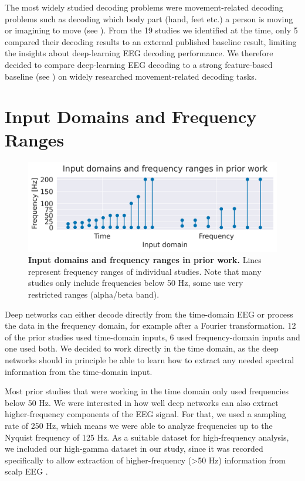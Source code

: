     The most widely studied decoding problems were movement-related decoding
problems such as decoding which body part (hand, feet etc.) a person is
moving or imagining to move (see
). From the 19 studies we
identified at the time, only 5 compared their decoding results to an
external published baseline result, limiting the insights about
deep-learning EEG decoding performance. We therefore decided to compare
deep-learning EEG decoding to a strong feature-based baseline (see
) on widely researched
movement-related decoding tasks.

\section{Input Domains and Frequency
Ranges}\label{input-domains-and-frequency-ranges}


\begin{figure}[ht]
    \myfloatalign
    \includegraphics[width=0.9\linewidth,trim={0 0 0 1cm},clip]{images/input-domain-freq-ranges.png}
    \caption[Input domains and frequency ranges in prior work.]{\textbf{Input domains and frequency ranges in prior work.} Lines represent frequency ranges of individual studies. Note that many studies
only include frequencies below 50 Hz, some use very restricted ranges
(alpha/beta band).}\label{input_domain_fig}
\end{figure}
    

    Deep networks can either decode directly from the time-domain EEG or
process the data in the frequency domain, for example after a Fourier
transformation. 12 of the prior studies used time-domain inputs, 6 used
frequency-domain inputs and one used both. We decided to work directly
in the time domain, as the deep networks should in principle be able to
learn how to extract any needed spectral information from the
time-domain input.

Most prior studies that were working in the time domain only used
frequencies below 50 Hz. We were interested in how well deep networks
can also extract higher-frequency components of the EEG
signal. For that, we used a sampling rate of 250 Hz, which means we were
able to analyze frequencies up to the Nyquist frequency of 125 Hz. As a
suitable dataset for high-frequency analysis, we
included our high-gamma dataset in our study, since it was recorded
specifically to allow extraction of higher-frequency (\textgreater50 Hz)
information from scalp EEG \citep{schirrmeisterdeephbm2017}.


